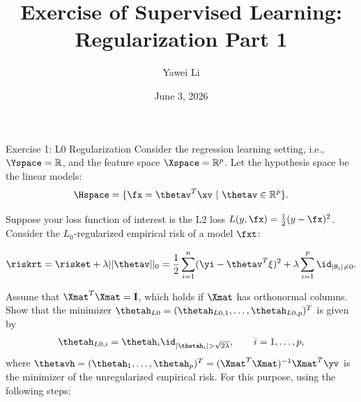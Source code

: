 \documentclass[aspectratio=169]{beamer}
\title[]{\textbf{Exercise of Supervised Learning: \\ Regularization Part 1}}
\author{Yawei Li}
\institute[LMU]
{
\\
  \texttt{yawei.li@stat.uni-muenchen.de}
}
\date{June 3, 2026}
\newcommand{\thetahi}{\thetah_i}
\newcommand{\thetainnz}{\id_{|\theta_i| \neq 0}}
\newcommand{\Imat}{\mathbf{I}}
\begin{document}
\begin{frame}
\titlepage

\end{frame}



\begin{frame}{Exercise 1: L0 Regularization}
	\small
	Consider the regression learning setting, i.e., $\Yspace = \mathbb{R}$, and the feature space $\Xspace = \mathbb{R}^p$. Let the hypothesis space be the linear models: $$\Hspace = \{ \fx = \thetav^T \xv \ | \ \thetav \in \mathbb{R}^p \}.$$
	
	Suppose your loss function of interest is the L2 loss $L(y, \fx) = \frac{1}{2} (y - \fx)^2$. Consider the $L_0$-regularized empirical risk of a model $\fxt$: 
	
	$$
		\riskrt = \risket + \lambda ||\thetav ||_0 = \frac{1}{2} \sum_{i=1}^n (\yi - \thetav^T \xi )^2 + \lambda \sum_{i=1}^p \thetainnz.
	$$
	
	Assume that $\Xmat^T \Xmat = \Imat$, which holds if $\Xmat$ has orthonormal columns. Show that the minimizer $\thetah_{L0} = (\thetah_{L0, 1}, \ldots, \thetah_{L0, p})^T$ is given by 
	$$
		\thetah_{L0, i} = \thetahi \id_{|\thetahi| > \sqrt{2 \lambda}}, \qquad i = 1, \ldots, p,
	$$
	where $\thetavh = (\thetah_1, \ldots, \thetah_p)^T = (\Xmat^T \Xmat)^{-1} \Xmat^T \yv$ is the minimizer of the unregularized empirical risk. For this purpose, using the following steps:

\end{frame}
\end{document}
